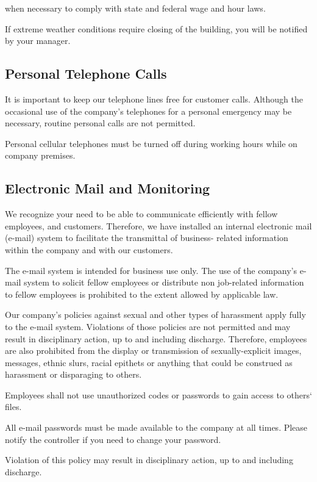 when necessary to comply with state and federal wage and hour laws.

If extreme weather conditions require closing of the building, you will be notified by your manager.

\subsection{Personal Telephone Calls}

It is important to keep our telephone lines free for customer calls. Although the occasional use of the company's telephones for a personal emergency may be necessary, routine personal calls are not permitted.

Personal cellular telephones must be turned off during working hours while on company premises.

\subsection{Electronic Mail and Monitoring}

We recognize your need to be able to communicate efficiently with fellow employees, and customers. Therefore, we have installed an internal electronic mail (e-mail) system to facilitate the transmittal of business- related information within the company and with our customers.

The e-mail system is intended for business use only. The use of the company's e-mail system to solicit fellow employees or distribute non job-related information to fellow employees is prohibited to the extent allowed by applicable law.

Our company's policies against sexual and other types of harassment apply fully to the e-mail system. Violations of those policies are not permitted and may result in disciplinary action, up to and including discharge. Therefore, employees are also prohibited from the display or transmission of sexually-explicit images, messages, ethnic slurs, racial epithets or anything that could be construed as harassment or disparaging to others.

Employees shall not use unauthorized codes or passwords to gain access to others‘ files.

All e-mail passwords must be made available to the company at all times. Please notify the controller if you need to change your password.

Violation of this policy may result in disciplinary action, up to and including discharge.

